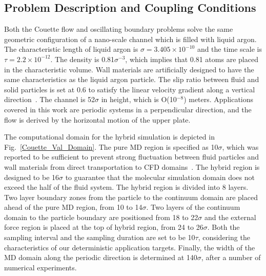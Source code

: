 \documentclass[preprint,12pt]{elsarticle}
\begin{document}
\subsection{Problem Description and Coupling Conditions}
\label{sec:accuracy_conditions}
Both the Couette flow and oscillating boundary problems solve the same geometric configuration of a nano-scale channel which is filled with liquid argon. The characteristic length of liquid argon is ${\sigma} =3.405{\times}10^{-10}$ and the time scale is  $\tau=2.2{\times}10^{-12}$. The density is 0.81${\sigma}^{-3}$, which implies that 0.81 atoms are placed in the characteristic volume. Wall materials are artificially designed to have the same characteristics as the liquid argon particle. The slip ratio between fluid and solid particles is set at 0.6 to satisfy the linear velocity gradient along a vertical direction~\cite{Nie}. The channel is 52$\sigma$ in height, which is  O(10$^{-8}$)  meters. Applications covered in this work are periodic systems in a perpendicular direction, and the flow is derived by the horizontal motion of the upper plate. 

The computational domain for the hybrid simulation is depicted in Fig.~\ref{Couette_Val_Domain}. The pure MD region is specified as 10$\sigma$, which was reported to be sufficient to prevent strong fluctuation between fluid particles and wall materials from direct transportation to CFD domains~\cite{Yen}. The hybrid region is designed to be 16$\sigma$ to guarantee that the molecular simulation domain does not exceed the half of the fluid system. The hybrid region is divided into 8 layers. Two layer boundary zones from the particle to the continuum domain are placed ahead of the pure MD region, from 10 to 14$\sigma$. Two layers of the continuum domain to the particle boundary are positioned from 18 to 22$\sigma$ and the external force region is placed at the top of hybrid region, from 24 to 26$\sigma$. Both the sampling interval and the sampling duration are set to be 10$\tau$, considering the characteristics of our deterministic application targets. Finally, the width of the MD domain along the periodic direction is determined at 140$\sigma$, after a number of numerical experiments. 

\end{document}
